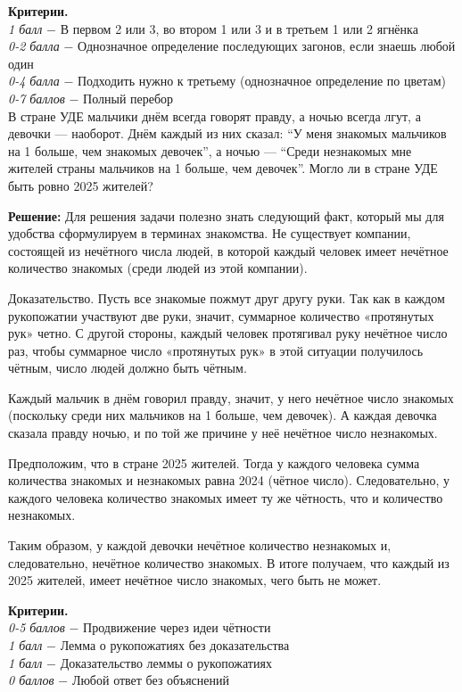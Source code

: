 \textbf{Критерии.} \\
\textit{1 балл} $-$ В первом 2 или 3, во втором 1 или 3 и в третьем 1 или 2 ягнёнка\\
\textit{0-2 балла} $-$ Однозначное определение последующих загонов, если знаешь любой один\\
\textit{0-4 балла} $-$ Подходить нужно к третьему (однозначное определение по цветам)\\
\textit{0-7 баллов} $-$ Полный перебор\\

 В стране УДЕ мальчики днём всегда говорят правду, а ночью всегда лгут, а девочки — наоборот. Днём каждый из них сказал: “У меня знакомых мальчиков на 1 больше, чем знакомых девочек”, а ночью — “Среди незнакомых мне жителей страны мальчиков на 1 больше, чем девочек”. Могло ли в стране УДЕ быть ровно 2025 жителей?

\textbf{Решение:} Для решения задачи полезно знать следующий факт, который мы для удобства сформулируем в терминах знакомства. Не существует компании, состоящей из нечётного числа людей, в которой каждый человек имеет нечётное количество знакомых (среди людей из этой компании).

Доказательство. Пусть все знакомые пожмут друг другу руки. Так как в каждом рукопожатии участвуют две руки, значит, суммарное количество «протянутых рук» четно. С другой стороны, каждый человек протягивал руку нечётное число раз, чтобы суммарное число «протянутых рук» в этой ситуации получилось чётным, число людей должно быть чётным.

Каждый мальчик в днём говорил правду, значит, у него нечётное число знакомых (поскольку среди них мальчиков на 1 больше, чем девочек). А каждая девочка сказала правду ночью, и по той же причине у неё нечётное число незнакомых.

Предположим, что в стране 2025 жителей. Тогда у каждого человека сумма количества знакомых и незнакомых равна 2024 (чётное число). Следовательно, у каждого человека количество знакомых имеет ту же чётность, что и количество незнакомых.

Таким образом, у каждой девочки нечётное количество незнакомых и, следовательно, нечётное количество знакомых. В итоге получаем, что каждый из 2025 жителей, имеет нечётное число знакомых, чего быть не может.

\textbf{Критерии.} \\
\textit{0-5 баллов} $-$ Продвижение через идеи чётности\\
\textit{1 балл} $-$ Лемма о рукопожатиях без доказательства\\
\textit{1 балл} $-$ Доказательство леммы о рукопожатиях\\
\textit{0 баллов} $-$ Любой ответ без объяснений\\


